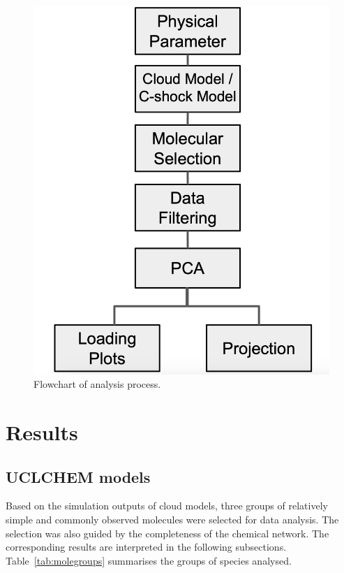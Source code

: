 \documentclass{aa}
\begin{document}
\begin{CJK*}{UTF8}{gbsn}
  \begin{figure}[H]
   \centering
   \captionsetup{justification=centering}
   \includegraphics[angle=0,scale = 0.3]{flowchart-3.png}
   \caption{Flowchart of analysis process.}
         \label{Fig1}
   \end{figure}

\section{Results}

\subsection{UCLCHEM models}

  Based on the simulation outputs of cloud models, three groups of relatively simple and commonly observed molecules were  selected for data analysis. The selection was also guided by the completeness of the chemical network. The corresponding results are interpreted in the following subsections. Table~\ref{tab:molegroups} summarises the groups of species analysed.
 


\end{CJK*}
\end{document}
